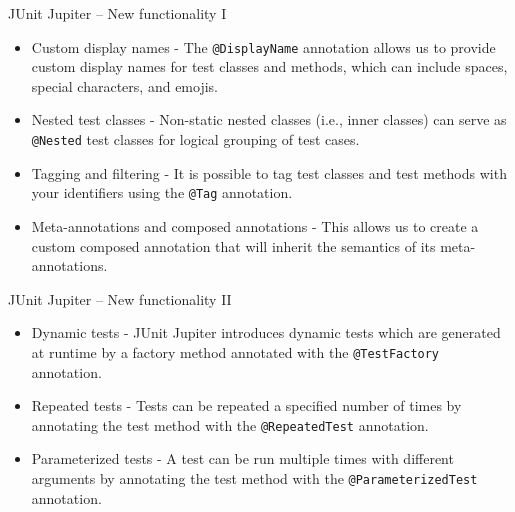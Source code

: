 \documentclass[11pt, xcolor=svgnames]{beamer}
\begin{document}
\begin{frame}{JUnit Jupiter -- New functionality I}

  \begin{itemize}
    \item Custom display names - The \texttt{@DisplayName} annotation allows us to provide custom display names for test classes and methods, which can include spaces, special characters, and emojis.
  
    \item Nested test classes - Non-static nested classes (i.e., inner classes) can serve as \texttt{@Nested} test classes for logical grouping of test cases. 
  
    \item Tagging and filtering - It is possible to tag test classes and test methods with your identifiers using the \texttt{@Tag} annotation. 
  
    \item Meta-annotations and composed annotations - This allows us to create a custom composed annotation that will inherit the semantics of its meta-annotations.
  \end{itemize}

\end{frame}


\begin{frame}{JUnit Jupiter -- New functionality II}

  \begin{itemize}
    \item Dynamic tests - JUnit Jupiter introduces dynamic tests which are generated at runtime by a factory method annotated with the \texttt{@TestFactory} annotation.
  
    \item Repeated tests - Tests can be repeated a specified number of times by annotating the test method with the \texttt{@RepeatedTest} annotation.
  
    \item Parameterized tests - A test can be run multiple times with different arguments by annotating the test method with the \texttt{@ParameterizedTest} annotation.
  \end{itemize}

\end{frame}
\end{document}
